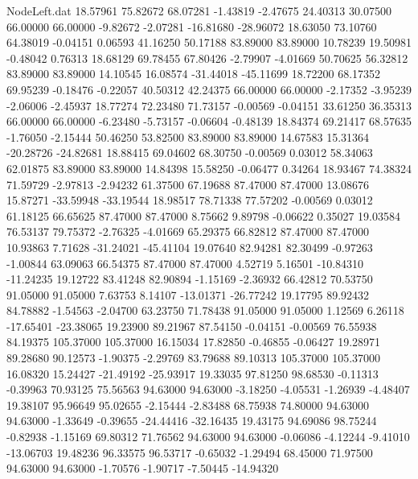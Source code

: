 \begin{filecontents}{NodeLeft.dat}
  18.57961   75.82672   68.07281    -1.43819   -2.47675   24.40313   30.07500   66.00000   66.00000   -9.82672   -2.07281  -16.81680  -28.96072
  18.63050   73.10760   64.38019    -0.04151    0.06593   41.16250   50.17188   83.89000   83.89000   10.78239   19.50981   -0.48042    0.76313
  18.68129   69.78455   67.80426    -2.79907   -4.01669   50.70625   56.32812   83.89000   83.89000   14.10545   16.08574  -31.44018  -45.11699
  18.72200   68.17352   69.95239    -0.18476   -0.22057   40.50312   42.24375   66.00000   66.00000   -2.17352   -3.95239   -2.06006   -2.45937
  18.77274   72.23480   71.73157    -0.00569   -0.04151   33.61250   36.35313   66.00000   66.00000   -6.23480   -5.73157   -0.06604   -0.48139
  18.84374   69.21417   68.57635    -1.76050   -2.15444   50.46250   53.82500   83.89000   83.89000   14.67583   15.31364  -20.28726  -24.82681
  18.88415   69.04602   68.30750    -0.00569    0.03012   58.34063   62.01875   83.89000   83.89000   14.84398   15.58250   -0.06477    0.34264
  18.93467   74.38324   71.59729    -2.97813   -2.94232   61.37500   67.19688   87.47000   87.47000   13.08676   15.87271  -33.59948  -33.19544
  18.98517   78.71338   77.57202    -0.00569    0.03012   61.18125   66.65625   87.47000   87.47000    8.75662    9.89798   -0.06622    0.35027
  19.03584   76.53137   79.75372    -2.76325   -4.01669   65.29375   66.82812   87.47000   87.47000   10.93863    7.71628  -31.24021  -45.41104
  19.07640   82.94281   82.30499    -0.97263   -1.00844   63.09063   66.54375   87.47000   87.47000    4.52719    5.16501  -10.84310  -11.24235
  19.12722   83.41248   82.90894    -1.15169   -2.36932   66.42812   70.53750   91.05000   91.05000    7.63753    8.14107  -13.01371  -26.77242
  19.17795   89.92432   84.78882    -1.54563   -2.04700   63.23750   71.78438   91.05000   91.05000    1.12569    6.26118  -17.65401  -23.38065
  19.23900   89.21967   87.54150    -0.04151   -0.00569   76.55938   84.19375  105.37000  105.37000   16.15034   17.82850   -0.46855   -0.06427
  19.28971   89.28680   90.12573    -1.90375   -2.29769   83.79688   89.10313  105.37000  105.37000   16.08320   15.24427  -21.49192  -25.93917
  19.33035   97.81250   98.68530    -0.11313   -0.39963   70.93125   75.56563   94.63000   94.63000   -3.18250   -4.05531   -1.26939   -4.48407
  19.38107   95.96649   95.02655    -2.15444   -2.83488   68.75938   74.80000   94.63000   94.63000   -1.33649   -0.39655  -24.44416  -32.16435
  19.43175   94.69086   98.75244    -0.82938   -1.15169   69.80312   71.76562   94.63000   94.63000   -0.06086   -4.12244   -9.41010  -13.06703
  19.48236   96.33575   96.53717    -0.65032   -1.29494   68.45000   71.97500   94.63000   94.63000   -1.70576   -1.90717   -7.50445  -14.94320

\end{filecontents}
